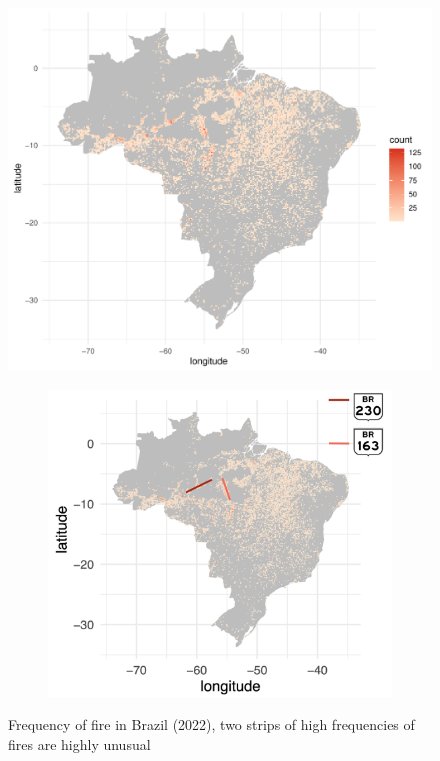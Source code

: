 \documentclass{article}\usepackage[]{graphicx}\usepackage[]{xcolor}
\makeatletter
\def\maxwidth{ %
  \ifdim\Gin@nat@width>\linewidth
    \linewidth
  \else
    \Gin@nat@width
  \fi
}
\newenvironment{knitrout}{}{} %
\numberwithin{equation}{section}
\makeatother
\begin{document}
\begin{figure}[htbp]
  \centering
  \begin{minipage}[b]{0.48\linewidth}
\begin{knitrout}\scriptsize
{}\color{fgcolor}

{\centering \includegraphics[width=\maxwidth]{figure/beamer-spacetime-fy22-1} 

}


\end{knitrout}
  \end{minipage}
  \hfill
  \begin{minipage}[b]{0.48\linewidth}
\begin{figure}[H]
    \centering
    \includegraphics[width=1\linewidth]{image_reference/mapshoot.png}
\end{figure}
  \end{minipage}
  \caption{Frequency of fire in Brazil (2022), two strips of high frequencies of fires are highly unusual}
  \label{fig:fire22}
\end{figure}
\end{document}
